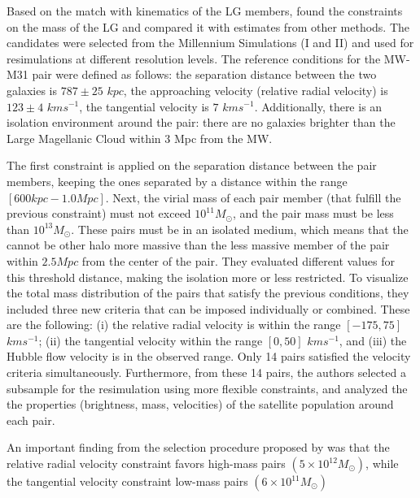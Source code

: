 \documentclass[10pt,twocolumn,letterpaper]{article}
\begin{document}
Based on the match with kinematics of the LG members, \cite{fattahi2016apostle} found the constraints on the mass of the LG and compared it with estimates from other methods. The candidates were selected from the Millennium Simulations (I and II) and used for resimulations at different resolution levels. The reference conditions for the MW-M31 pair were defined as follows: the separation distance between the two galaxies is $787 \pm 25$ $kpc$, the approaching velocity (relative radial velocity) is $123 \pm 4$ $kms^{-1}$, the tangential velocity is $7$ $kms^{-1}$. Additionally, there is an isolation environment around \cite{forero2018we}
the pair: there are no galaxies brighter than the Large Magellanic Cloud within 3 Mpc from the MW. 

The first constraint is applied on the separation distance between the pair members, keeping the ones separated by a distance within the range $[600kpc-1.0Mpc]$. Next, the virial mass of each pair member (that fulfill the previous constraint) must not exceed $10^{11} M_\odot$, and the pair mass must be less than $10^{13} M_\odot$. These pairs must be in an isolated medium, which means that the cannot be other halo more massive than the less massive member of the pair within $2.5Mpc$ from the center of the pair. They evaluated different values for this threshold distance, making the isolation more or less restricted. To visualize the total mass distribution of the pairs that satisfy the previous conditions, they included three new criteria that can be imposed individually or combined. These are the following: (i) the relative radial velocity is within the range $[-175,75]$ $kms^{-1}$; (ii) the tangential velocity within the range $[0,50]$ $kms^{-1}$, and (iii) the Hubble flow velocity is in the observed range. Only 14 pairs satisfied the velocity criteria simultaneously. Furthermore, from these 14 pairs, the authors selected a subsample for the resimulation using more flexible constraints, and analyzed the the properties (brightness, mass, velocities) of the satellite population around each pair.

An important finding from the selection procedure proposed by \cite{fattahi2016apostle} was that the relative radial velocity constraint favors high-mass pairs $(5\times 10^{12} M_\odot)$, while the tangential velocity constraint low-mass pairs $(6\times 10^{11} M_\odot)$


\end{document}
